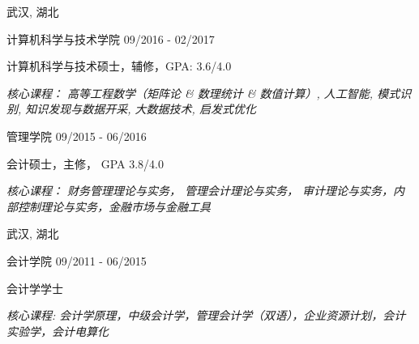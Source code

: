 \vspace{-6.0mm}

\begin{cventries}
\vspace{-1.5mm}
\cveducation
{}
{武汉, 湖北}

\cvsubeducation
{计算机科学与技术学院}
{09/2016 - 02/2017}
{
    \begin{cvitems}
    \item {计算机科学与技术硕士，辅修，GPA: 3.6/4.0}
    \item {\itshape{核心课程： 高等工程数学（矩阵论 \& 数理统计 \& 数值计算）, 人工智能, 模式识别, 知识发现与数据开采, 大数据技术, 启发式优化}}
    \end{cvitems}
}
\vspace{-1.0mm}

\cvsubeducation
{管理学院}
{09/2015 - 06/2016}
{
    \begin{cvitems}
    \item {会计硕士，主修， GPA 3.8/4.0}
    \item {\itshape{核心课程： 财务管理理论与实务， 管理会计理论与实务， 审计理论与实务，内部控制理论与实务，金融市场与金融工具}}
    \end{cvitems}
}

\cveducation
{}
{武汉, 湖北}

\cvsubeducation
{会计学院}
{09/2011 - 06/2015}
{
    \begin{cvitems}
    \item {会计学学士}
    \item {\itshape{核心课程: 会计学原理，中级会计学，管理会计学（双语），企业资源计划，会计实验学，会计电算化}}
    \end{cvitems}
}
\end{cventries}